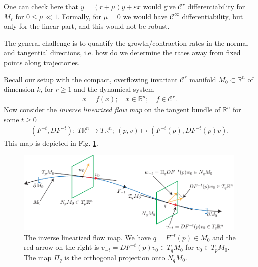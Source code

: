 \begin{ex}[]
	One can check here that $\dot{y}= (r+\mu )y + \varepsilon x$ would give $\mathcal{C}^{r}$ differentiability for $M_{\varepsilon}$ for $0 \leq \mu \ll 1$. Formally, for $\mu=0 $ we would have $\mathcal{C}^{\infty }$ differentiability, but only for the linear part, and this would not be robust.	
\end{ex}

The general challenge is to quantify the growth/contraction rates in the normal and tangential directions, i.e. how do we determine the rates away from fixed points along trajectories.

Recall our setup with the compact, overflowing invariant $\mathcal{C}^{r}$ manifold $M_0 \subset   \mathbb{R}^{n}$ of dimension $k$, for $r\geq 1$ and the dynamical system 
\begin{align}
	\dot{x} = f(x);\quad x \in \mathbb{R}^{n};\quad f\in \mathcal{C}^{r}.
\end{align}
Now consider the \emph{inverse linearized flow map} on the tangent bundle of $\mathbb{R}^{n}$ for some $t\geq 0$
\begin{align}
	(F^{-t}, DF^{-t}):\ T\mathbb{R}^{n} \to T\mathbb{R}^{n};\ (p,v) \mapsto \left(F^{-t}(p), DF^{-t}(p)v\right).
\end{align}
This map is depicted in Fig. \ref{fig:inv_lin_flow_map}.
\begin{figure}[h!]
	\centering
	\includegraphics[width=0.99\textwidth]{figures/ch9/13inv_lin_flow_map.pdf}
	\caption{The inverse linearized flow map. We have $q=F^{-t}(p)\in M_0$ and the red arrow on the right is $v_{-t}=DF^{-t}(p)v_0 \in T_{q}M_0$ for $v_0 \in T_{p}M_0$. The map $\Pi_{q}$ is the orthogonal projection onto $N_{q}M_0$.}
	\label{fig:inv_lin_flow_map}
\end{figure}

